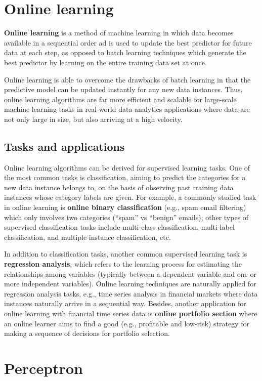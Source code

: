 \section{Online learning}
\textbf{Online learning} is a method of machine learning in which data becomes available in a sequential order ad is used to update the best predictor for future data at each step, as opposed to batch learning techniques which generate the best predictor by learning on the entire training data set at once.

Online learning is able to overcome the drawbacks of batch learning in that the predictive model can be updated instantly for any new data instances. Thus, online learning algorithms are far more efficient and scalable for large-scale machine learning tasks in real-world data analytics applications where data are not only large in size, but also arriving at a high velocity.

\subsection{Tasks and applications}
Online learning algorithms can be derived for supervised learning tasks. One of the most common tasks is classification, aiming to predict the categories for a new data instance belongs to, on the basis of observing past training data instances whose category labels are given. For example, a commonly studied task in online learning is \textbf{online binary classification} (e.g., spam email filtering) which only involves two categories (“spam” vs “benign” emails); other types of supervised classification tasks include multi-class classification, multi-label classification, and multiple-instance classification, etc.

In addition to classification tasks, another common supervised learning task is \textbf{regression analysis}, which refers to the learning process for estimating the relationships among variables (typically between a dependent variable and one or more independent variables). Online learning techniques are naturally applied for regression analysis tasks, e.g., time series analysis in financial markets where data instances naturally arrive in a sequential way. Besides, another application for online learning with financial time series data is \textbf{online portfolio section} where an online learner aims to find a good (e.g., profitable and low-risk) strategy for making a sequence of decisions for portfolio selection.

\section{Perceptron}

